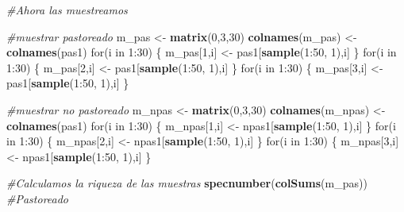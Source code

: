 \documentclass[]{book}
\newenvironment{Shaded}{\begin{snugshade}}{\end{snugshade}}
\newcommand{\KeywordTok}[1]{\textcolor[rgb]{0.13,0.29,0.53}{\textbf{{#1}}}}
\newcommand{\DecValTok}[1]{\textcolor[rgb]{0.00,0.00,0.81}{{#1}}}
\newcommand{\StringTok}[1]{\textcolor[rgb]{0.31,0.60,0.02}{{#1}}}
\newcommand{\CommentTok}[1]{\textcolor[rgb]{0.56,0.35,0.01}{\textit{{#1}}}}
\newcommand{\NormalTok}[1]{{#1}}
\begin{document}
\begin{Shaded}
\begin{Highlighting}[]
\CommentTok{#Ahora las muestreamos}

\CommentTok{#muestrar pastoreado}
\NormalTok{m_pas <-}\StringTok{ }\KeywordTok{matrix}\NormalTok{(}\DecValTok{0}\NormalTok{,}\DecValTok{3}\NormalTok{,}\DecValTok{30}\NormalTok{)}
\KeywordTok{colnames}\NormalTok{(m_pas) <-}\StringTok{ }\KeywordTok{colnames}\NormalTok{(pas1)}
\NormalTok{for(i in }\DecValTok{1}\NormalTok{:}\DecValTok{30}\NormalTok{) \{}
\NormalTok{m_pas[}\DecValTok{1}\NormalTok{,i] <-}\StringTok{ }\NormalTok{pas1[}\KeywordTok{sample}\NormalTok{(}\DecValTok{1}\NormalTok{:}\DecValTok{50}\NormalTok{, }\DecValTok{1}\NormalTok{),i]}
\NormalTok{\}}
\NormalTok{for(i in }\DecValTok{1}\NormalTok{:}\DecValTok{30}\NormalTok{) \{}
\NormalTok{m_pas[}\DecValTok{2}\NormalTok{,i] <-}\StringTok{ }\NormalTok{pas1[}\KeywordTok{sample}\NormalTok{(}\DecValTok{1}\NormalTok{:}\DecValTok{50}\NormalTok{, }\DecValTok{1}\NormalTok{),i]}
\NormalTok{\}}
\NormalTok{for(i in }\DecValTok{1}\NormalTok{:}\DecValTok{30}\NormalTok{) \{}
\NormalTok{m_pas[}\DecValTok{3}\NormalTok{,i] <-}\StringTok{ }\NormalTok{pas1[}\KeywordTok{sample}\NormalTok{(}\DecValTok{1}\NormalTok{:}\DecValTok{50}\NormalTok{, }\DecValTok{1}\NormalTok{),i]}
\NormalTok{\}}

\CommentTok{#muestrar no pastoreado}
\NormalTok{m_npas <-}\StringTok{ }\KeywordTok{matrix}\NormalTok{(}\DecValTok{0}\NormalTok{,}\DecValTok{3}\NormalTok{,}\DecValTok{30}\NormalTok{)}
\KeywordTok{colnames}\NormalTok{(m_npas) <-}\StringTok{ }\KeywordTok{colnames}\NormalTok{(pas1)}
\NormalTok{for(i in }\DecValTok{1}\NormalTok{:}\DecValTok{30}\NormalTok{) \{}
\NormalTok{m_npas[}\DecValTok{1}\NormalTok{,i] <-}\StringTok{ }\NormalTok{npas1[}\KeywordTok{sample}\NormalTok{(}\DecValTok{1}\NormalTok{:}\DecValTok{50}\NormalTok{, }\DecValTok{1}\NormalTok{),i]}
\NormalTok{\}}
\NormalTok{for(i in }\DecValTok{1}\NormalTok{:}\DecValTok{30}\NormalTok{) \{}
\NormalTok{m_npas[}\DecValTok{2}\NormalTok{,i] <-}\StringTok{ }\NormalTok{npas1[}\KeywordTok{sample}\NormalTok{(}\DecValTok{1}\NormalTok{:}\DecValTok{50}\NormalTok{, }\DecValTok{1}\NormalTok{),i]}
\NormalTok{\}}
\NormalTok{for(i in }\DecValTok{1}\NormalTok{:}\DecValTok{30}\NormalTok{) \{}
\NormalTok{m_npas[}\DecValTok{3}\NormalTok{,i] <-}\StringTok{ }\NormalTok{npas1[}\KeywordTok{sample}\NormalTok{(}\DecValTok{1}\NormalTok{:}\DecValTok{50}\NormalTok{, }\DecValTok{1}\NormalTok{),i]}
\NormalTok{\}}

\CommentTok{#Calculamos la riqueza de las muestras}
\KeywordTok{specnumber}\NormalTok{(}\KeywordTok{colSums}\NormalTok{(m_pas)) }\CommentTok{#Pastoreado}
\end{Highlighting}
\end{Shaded}
\end{document}

